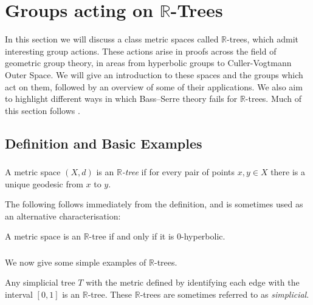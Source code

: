 \section{Groups acting on $\mathbb{R}$-Trees}
\label{sec:groups_acting_on_R_trees}

In this section we will discuss a class metric spaces called $\mathbb{R}$-trees, which admit interesting group actions. These actions arise in proofs across the field of geometric group theory, in areas from hyperbolic groups to Culler-Vogtmann Outer Space. We will give an introduction to these spaces and the groups which act on them, followed by an overview of some of their applications. We also aim to highlight different ways in which Bass--Serre theory fails for $\mathbb{R}$-trees. Much of this section follows \cite{Bestvina_trees}.
\subsection{Definition and Basic Examples}
\subsubsection{}
\begin{definition}
    A metric space $(X,d)$ is an \emph{$\mathbb{R}$-tree} if for every pair of points $x,y\in X$ there is a unique geodesic from $x$ to $y$.
\end{definition}

The following follows immediately from the definition, and is sometimes used as an alternative characterisation:

\begin{proposition}
    A metric space is an $\mathbb{R}$-tree if and only if it is 0-hyperbolic.
\end{proposition}

\subsubsection{} We now give some simple examples of $\mathbb{R}$-trees.

\begin{example}
    Any simplicial tree $T$ with the metric defined by identifying each edge with the interval $[0,1]$ is an $\mathbb{R}$-tree. These $\mathbb{R}$-trees are sometimes referred to as \emph{simplicial}.
\end{example}

